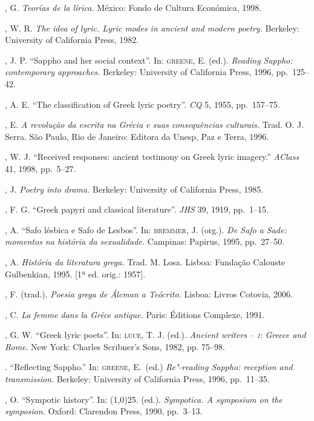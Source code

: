 \begin{bibliohedra}
, G. \textit{Teorías de la lírica.} México: Fondo de
Cultura Económica, 1998.

, W. R. \textit{The idea of lyric. Lyric modes in ancient and
modern poetry.} Berkeley: University of California Press, 1982.

, J. P. “Sappho and her social context”. In: \textsc{greene}, E.
(ed.). \textit{Reading Sappho: contemporary approaches.} Berkeley: University
of California Press, 1996, pp.~125--42.

, A. E. “The classification of Greek lyric poetry”. \textit{CQ}
5, 1955, pp.~157--75.

, E. \textit{A revolução da escrita na Grécia e suas
consequências culturais.} Trad. O. J. Serra. São Paulo, Rio de Janeiro: Editora
da Unesp, Paz e Terra, 1996.

, W. J. ``Received responses: ancient testimony on Greek lyric imagery.'' 
\textit{AClass} 41, 1998, pp.~5--27. 

, J. \textit{Poetry into drama.} Berkeley: University of
California Press, 1985.

, F. G. “Greek papyri and classical literature”.
\textit{JHS} 39, 1919, pp.~1--15.

, A. “Safo lésbica e Safo de Lesbos”. In: \textsc{bremmer}, J.
(org.). \textit{De Safo a Sade: momentos na história da sexualidade.} Campinas:
Papirus, 1995, pp.~27--50.

, A. \textit{História da literatura grega.} Trad. M. Losa. Lisboa:
Fundação Calouste Gulbenkian, 1995. [1ª ed. orig.: 1957].

, F. (trad.). \textit{Poesia grega de Álcman a Teócrito.}
Lisboa: Livros Cotovia, 2006.

, C. \textit{La femme dans la Grèce antique.} Paris: Éditions
Complexe, 1991.

, G. W. “Greek lyric poets”. In: \textsc{luce}, T. J. (ed.). \textit{Ancient writers -- \textsc{i}: Greece and Rome}. New York: Charles Scribner's Sons, 1982, pp. 75--98. 

\titidem. ``Reflecting Sappho.'' In: \textsc{greene}, E.~(ed.) 
\textit{Re"-reading Sappho: reception and transmission}. Berkeley: University of California Press,
1996, pp.~11--35.

, O. “Sympotic history”. In: \line(1,0){25}. (ed.).
\textit{Sympotica. A symposium on the symposion.} Oxford: Clarendon Press,
1990, pp.~3--13.


\end{bibliohedra}
